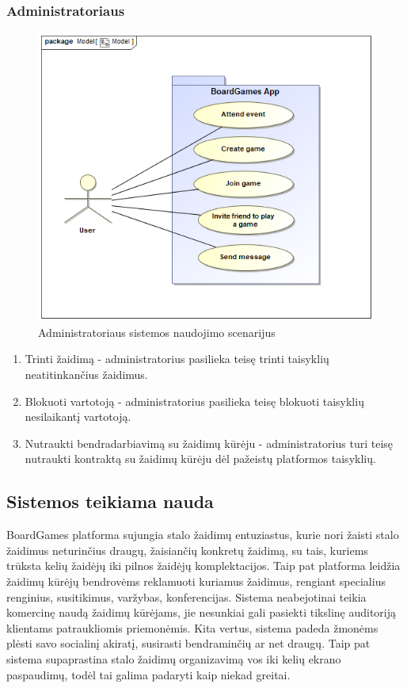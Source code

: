 \documentclass{VUMIFPSkursinis}
\begin{document}
		\subsubsection {Administratoriaus}
			\begin{figure}[H]
				\centering
				\includegraphics[scale=0.5]{img/UserUseCase}
				\caption{Administratoriaus sistemos naudojimo scenarijus}
				\label{img:UserUseCase}
			\end{figure}
			
			\begin{enumerate}
				\item Trinti žaidimą - administratorius pasilieka teisę trinti 
				taisyklių neatitinkančius žaidimus.
				\item Blokuoti vartotoją - administratorius pasilieka teisę blokuoti 
				taisyklių nesilaikantį vartotoją.
				\item Nutraukti bendradarbiavimą su žaidimų kūrėju - administratorius 
				turi teisę nutraukti kontraktą su žaidimų kūrėju dėl pažeistų platformos taisyklių.			
			\end{enumerate}	
			
	\subsection {Sistemos teikiama nauda}
	BoardGames platforma sujungia stalo žaidimų entuziastus, kurie nori žaisti 
	stalo žaidimus neturinčius draugų, žaisiančių konkretų žaidimą, su tais, 
	kuriems trūksta kelių žaidėjų iki pilnos žaidėjų komplektacijos. Taip pat 
	platforma leidžia žaidimų kūrėjų bendrovėms reklamuoti kuriamus žaidimus, 
	rengiant specialius renginius, susitikimus, varžybas, konferencijas. Sistema 
	neabejotinai teikia komercinę naudą žaidimų kūrėjams, jie nesunkiai gali 
	pasiekti tikslinę auditoriją klientams patraukliomis priemonėmis. Kita vertus, 
	sistema padeda žmonėms plėsti savo socialinį akiratį, susirasti bendraminčių 
	ar net draugų. Taip pat sistema supaprastina stalo žaidimų organizavimą vos iki 
	kelių ekrano paspaudimų, todėl tai galima padaryti kaip niekad greitai.	
	
\end{document}
